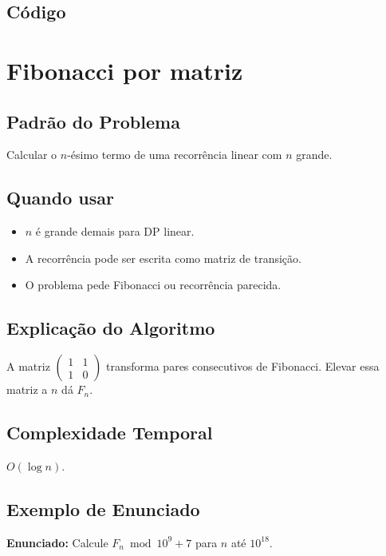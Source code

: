 \subsection{Código}

\section{Fibonacci por matriz}

\subsection{Padrão do Problema}
Calcular o $n$-ésimo termo de uma recorrência linear com $n$ grande.

\subsection{Quando usar}
\begin{itemize}[nosep]
  \item $n$ é grande demais para DP linear.
  \item A recorrência pode ser escrita como matriz de transição.
  \item O problema pede Fibonacci ou recorrência parecida.
\end{itemize}

\subsection{Explicação do Algoritmo}
A matriz $\begin{pmatrix}1&1\\1&0\end{pmatrix}$ transforma pares consecutivos de Fibonacci. Elevar essa matriz a $n$ dá $F_n$.

\subsection{Complexidade Temporal}
$O(\log n)$.

\subsection{Exemplo de Enunciado}
\begin{exemplodiabox}
\textbf{Enunciado:} Calcule $F_n \bmod 10^9+7$ para $n$ até $10^{18}$.
\end{exemplodiabox}

